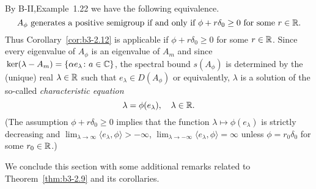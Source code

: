 \begin{example}
\begin{enumerate}[\upshape (i), wide, labelindent=.5em]
By B-II,Example~1.22 we have the following equivalence.
\begin{equation}\label{eq:b3-2.29}
	A_{\phi} \text{ generates a positive semigroup if and only if } \phi + r\delta_{0} \geq 0 \text{ for some } r \in \mathbb{R}.
\end{equation}
Thus Corollary~\ref{cor:b3-2.12} is applicable if $\phi + r\delta_{0} \geq 0$ for some $r \in \mathbb{R}$.
Since every eigenvalue of $A_{\phi}$ is an eigenvalue of $A_{m}$ and since $\mathop{}\mathrm{ker}(\lambda-A_{m}) = \{\alpha e_{\lambda} \colon a \in \mathbb{C}\}$, the spectral bound $s(A_{\phi})$ is determined by the (unique) real $\lambda \in \mathbb{R}$ such that $e_{\lambda} \in D(A_{\phi})$ or equivalently, $\lambda$ is a solution of the so-called \emph{characteristic equation}
\begin{equation}\label{eq:b3-2.30}
	\lambda = \phi(e_{\lambda}), \quad \lambda \in \mathbb{R}.
\end{equation}
(The assumption $\phi + r\delta_{0} \geq 0$ implies that the function $\lambda \mapsto \phi(e_{\lambda})$ is strictly decreasing and $\lim_{\lambda \to \infty}\langle e_{\lambda},\phi \rangle > -\infty$, $\lim_{\lambda \to -\infty}\langle e_{\lambda},\phi \rangle = \infty$ unless $\phi = r_{0}\delta_{0}$ for some $r_{0} \in \mathbb{R}$.)
\end{enumerate}
\end{example}
We conclude this section with some additional remarks related to Theorem~\ref{thm:b3-2.9} and its corollaries.
